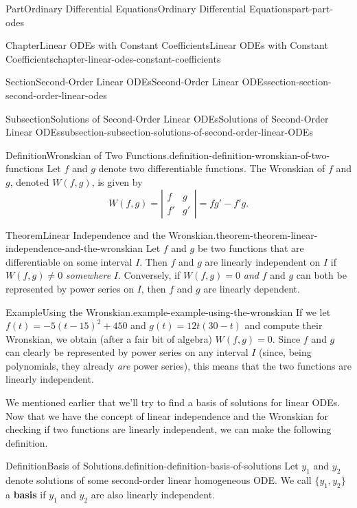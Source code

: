 \documentclass[twoside,10pt,]{book}
\newcommand{\terminology}[1]{\textbf{#1}}
\numberwithin{equation}{part}
\begin{document}
\begin{partptx}{Part}{Ordinary Differential Equations}{}{Ordinary Differential Equations}{}{}{part-part-odes}
\begin{chapterptx}{Chapter}{Linear ODEs with Constant Coefficients}{}{Linear ODEs with Constant Coefficients}{}{}{chapter-linear-odes-constant-coefficients}
\begin{sectionptx}{Section}{Second-Order Linear ODEs}{}{Second-Order Linear ODEs}{}{}{section-section-second-order-linear-odes}
\begin{subsectionptx}{Subsection}{Solutions of Second-Order Linear ODEs}{}{Solutions of Second-Order Linear ODEs}{}{}{subsection-subsection-solutions-of-second-order-linear-ODEs}
\begin{definition}{Definition}{Wronskian of Two Functions.}{definition-definition-wronskian-of-two-functions}%
%
Let \(f\) and \(g\) denote two differentiable functions. The Wronskian of \(f\) and \(g\), denoted \(W(f,g)\), is given by%
\begin{equation*}
W(f,g) = \left|\begin{matrix} f & g \\ f' & g' \end{matrix}\right| = fg' - f'g.
\end{equation*}
%
\end{definition}
\begin{theorem}{Theorem}{Linear Independence and the Wronskian.}{}{theorem-theorem-linear-independence-and-the-wronskian}%
Let \(f\) and \(g\) be two functions that are differentiable on some interval \(I\). Then \(f\) and \(g\) are linearly independent on \(I\) if \(W(f,g) \neq 0\) \emph{somewhere} \(I\). Conversely, if \(W(f,g) = 0\) \emph{and} \(f\) and \(g\) can both be represented by power series on \(I\), then \(f\) and \(g\) are linearly dependent.%
\end{theorem}
\begin{example}{Example}{Using the Wronskian.}{example-example-using-the-wronskian}%
If we let \(f(t) = -5(t-15)^{2} + 450\) and \(g(t) = 12t(30-t)\) and compute their Wronskian, we obtain (after a fair bit of algebra) \(W(f,g) = 0\). Since \(f\) and \(g\) can clearly be represented by power series on any interval \(I\) (since, being polynomials, they already \emph{are} power series), this means that the two functions are linearly independent.%
\end{example}
We mentioned earlier that we'll try to find a basis of solutions for linear ODEs. Now that we have the concept of linear independence and the Wronskian for checking if two functions are linearly independent, we can make the following definition.%
\begin{definition}{Definition}{Basis of Solutions.}{definition-definition-basis-of-solutions}%
%
Let \(y_{1}\) and \(y_{2}\) denote solutions of some second-order linear homogeneous ODE. We call \(\{y_{1},y_{2}\}\) a \terminology{basis} if \(y_{1}\) and \(y_{2}\) are also linearly independent.%
\end{definition}

\end{subsectionptx}
\end{sectionptx}
\end{chapterptx}
\end{partptx}
\end{document}
